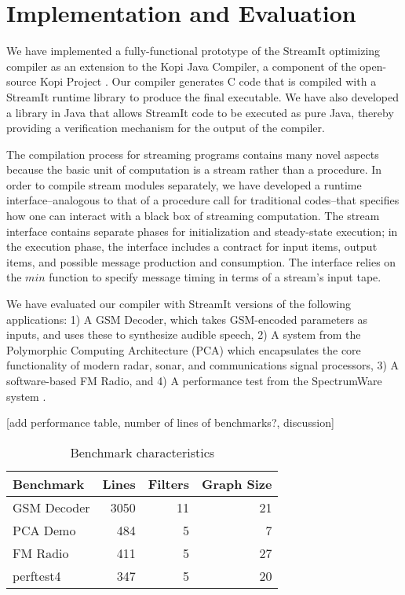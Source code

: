 \section{Implementation and Evaluation}

We have implemented a fully-functional prototype of the StreamIt
optimizing compiler as an extension to the Kopi Java Compiler, a
component of the open-source Kopi Project \cite{kopi}.  Our compiler
generates C code that is compiled with a StreamIt runtime library to
produce the final executable.  We have also developed a library in
Java that allows StreamIt code to be executed as pure Java, thereby
providing a verification mechanism for the output of the compiler.

The compilation process for streaming programs contains many novel
aspects because the basic unit of computation is a stream rather than
a procedure.  In order to compile stream modules separately, we have
developed a runtime interface--analogous to that of a procedure call
for traditional codes--that specifies how one can interact with a
black box of streaming computation.  The stream interface contains
separate phases for initialization and steady-state execution; in the
execution phase, the interface includes a contract for input items,
output items, and possible message production and consumption.  The
interface relies on the $min$ function to specify message timing in
terms of a stream's input tape.

We have evaluated our compiler with StreamIt versions of the following
applications: 1) A GSM Decoder, which takes GSM-encoded parameters as
inputs, and uses these to synthesize audible speech, 2) A system from
the Polymorphic Computing Architecture (PCA) \cite{pca} which
encapsulates the core functionality of modern radar, sonar, and
communications signal processors, 3) A software-based FM Radio, and 4)
A performance test from the SpectrumWare system \cite{spectrumware}.

[add performance table, number of lines of benchmarks?, discussion]

\begin{table}[t]
\begin{center}
\scriptsize
\begin{tabular}{|l|r|r|r|} \hline
Benchmark       & Lines   & Filters & Graph Size\\
\hline \hline
GSM Decoder      & 3050       & 11  & 21 \\
\hline
PCA Demo & 484 & 5 & 7\\
\hline
FM Radio & 411 & 5 & 27\\
\hline
perftest4 & 347 & 5 & 20\\
\hline
\end{tabular}
\vspace{-6pt}
\caption{\protect\small Benchmark characteristics}
\label{tab:benchmarks}
\end{center}
\end{table}




